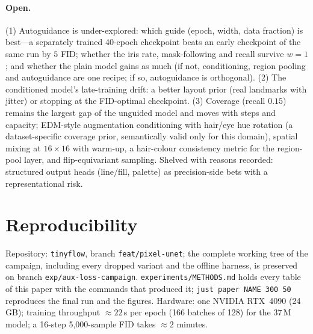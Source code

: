 \documentclass[11pt]{article}
\begin{document}
\paragraph{Open.} (1) Autoguidance is under-explored: which guide (epoch, width,
data fraction) is best---a separately trained 40-epoch checkpoint beats an early
checkpoint of the same run by $5$ FID; whether the iris rate, mask-following and recall
survive $w=1$; and whether the plain model gains as much (if not, conditioning, region
pooling and autoguidance are one recipe; if so, autoguidance is orthogonal). (2) The
conditioned model's late-training drift: a better layout prior (real landmarks with
jitter) or stopping at the FID-optimal checkpoint. (3) Coverage (recall $0.15$) remains
the largest gap of the unguided model and moves with steps and capacity; EDM-style
augmentation conditioning with hair/eye hue rotation (a dataset-specific coverage prior,
semantically valid only for this domain), spatial mixing at $16\times16$ with warm-up,
a hair-colour consistency metric for the region-pool layer, and flip-equivariant
sampling. Shelved with reasons recorded: structured output heads (line/fill, palette) as
precision-side bets with a representational risk.

\section*{Reproducibility}

Repository: \texttt{tinyflow}, branch \texttt{feat/pixel-unet}; the complete working tree
of the campaign, including every dropped variant and the offline harness, is preserved
on branch \texttt{exp/aux-loss-campaign}. \texttt{experiments/METHODS.md} holds every
table of this paper with the commands that produced it; \texttt{just paper NAME 300 50}
reproduces the final run and the figures. Hardware: one NVIDIA RTX~4090 (24\,GB);
training throughput $\approx22$\,s per epoch (166 batches of 128) for the $37$\,M model;
a 16-step 5{,}000-sample FID takes $\approx2$ minutes.
\end{document}
